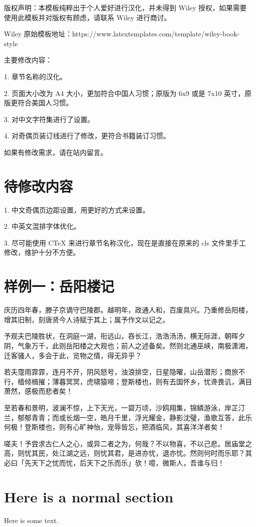 \documentclass{WileySev}
\begin{document}
版权声明：本模板纯粹出于个人爱好进行汉化，并未得到 Wiley 授权，如果需要使用此模板并对版权有顾虑，请联系 Wiley 进行商讨。

Wiley 原始模板地址：https://www.latextemplates.com/template/wiley-book-style

主要修改内容：

1. 章节名称的汉化。

2. 页面大小改为 A4 大小，更加符合中国人习惯；原版为 6x9 或是 7x10 英寸，原版更符合美国人习惯。

3. 对中文字符集进行了设置。

4. 对奇偶页装订线进行了修改，更符合书籍装订习惯。

如果有修改需求，请在站内留言。

\section{待修改内容}

1. 中文奇偶页边距设置，用更好的方式来设置。

2. 中英文混排字体优化。

3. 尽可能使用 CTeX 来进行章节名称汉化，现在是直接在原来的 cls 文件里手工修改，维护十分不方便。

\section{样例一：岳阳楼记}

庆历四年春，滕子京谪守巴陵郡。越明年，政通人和，百废具兴。乃重修岳阳楼，增其旧制，刻唐贤今人诗赋于其上；属予作文以记之。

予观夫巴陵胜状，在洞庭一湖，衔远山，吞长江，浩浩汤汤，横无际涯，朝晖夕阴，气象万千，此则岳阳楼之大观也；前人之述备矣。然则北通巫峡，南极潇湘，迁客骚人，多会于此，览物之情，得无异乎？

若夫霪雨霏霏，连月不开，阴风怒号，浊浪排空，日星隐曜，山岳潜形；商旅不行，樯倾楫摧；薄暮冥冥，虎啸猿啼；登斯楼也，则有去国怀乡，忧谗畏讥，满目萧然，感极而悲者矣！

至若春和景明，波澜不惊，上下天光，一碧万顷，沙鸥翔集，锦鳞游泳，岸芷汀兰，郁郁青青；而或长烟一空，皓月千里，浮光耀金，静影沈璧，渔歌互答，此乐何极！登斯楼也，则有心旷神怡，宠辱皆忘，把酒临风，其喜洋洋者矣！

嗟夫！予尝求古仁人之心，或异二者之为，何哉？不以物喜，不以己悲。居庙堂之高，则忧其民，处江湖之远，则忧其君，是进亦忧，退亦忧。然则何时而乐耶？其必曰「先天下之忧而忧，后天下之乐而乐」欤！噫，微斯人，吾谁与归！

\section{Here is a normal section}
Here is some text.
\end{document}
